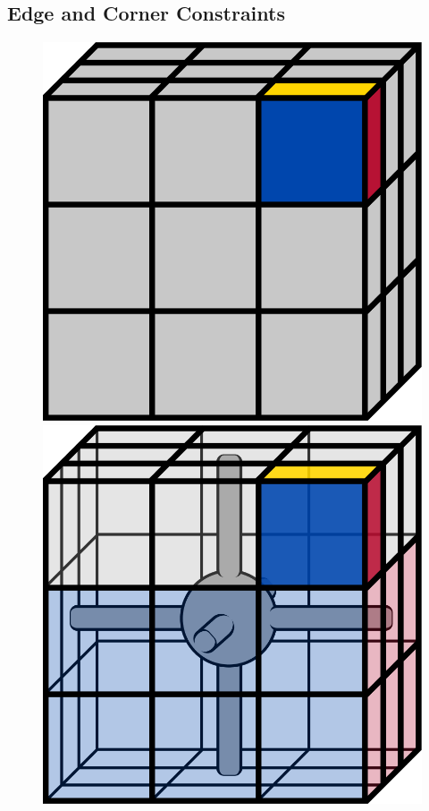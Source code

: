 \documentclass[12pt]{article}
\begin{document}
\subsection{Edge and Corner Constraints}

\begin{figure}[h]
    \centering
    \begin{minipage}[c]{0.2\textwidth}
        \includegraphics[scale=0.1]{cubies/cubies_1.png}
    \end{minipage}
    \begin{minipage}[c]{0.2\textwidth}
        \includegraphics[scale=0.1]{cubies/cubies_2.png}

\end{minipage}
\end{figure}
\end{document}
